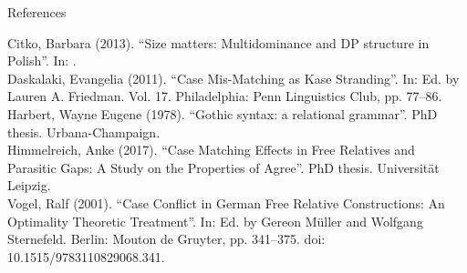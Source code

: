 \documentclass[xcolor=dvipsnames,10pt]{beamer}
\begin{document}
\begin{frame}{References}

Citko, Barbara (2013). “Size matters: Multidominance and DP structure in Polish”. In: .\\
Daskalaki, Evangelia (2011). “Case Mis-Matching as Kase Stranding”. In:  Ed. by Lauren A. Friedman. Vol. 17. Philadelphia: Penn Linguistics Club, pp. 77–86.\\
Harbert, Wayne Eugene (1978). “Gothic syntax: a relational grammar”. PhD thesis. Urbana-Champaign.\\
Himmelreich, Anke (2017). “Case Matching Effects in Free Relatives and Parasitic Gaps: A Study on the Properties of Agree”. PhD thesis. Universität Leipzig.\\
Vogel, Ralf (2001). “Case Conflict in German Free Relative Constructions: An Optimality Theoretic Treatment”. In:  Ed. by Gereon Müller and Wolfgang Sternefeld. Berlin: Mouton de Gruyter, pp. 341–375. doi: 10.1515/9783110829068.341.

\end{frame}
\end{document}
